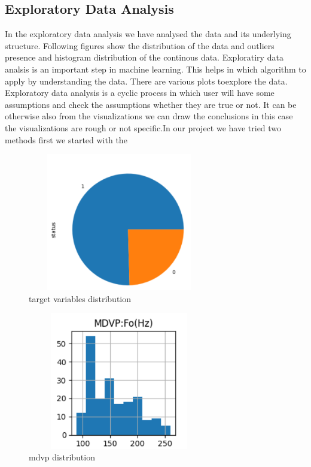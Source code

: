 \documentclass[conference]{IEEEtran}
\begin{document}
 \subsection{Exploratory Data Analysis}
In the exploratory data analysis we have analysed the data and its underlying structure. Following figures show the distribution of the data and outliers presence and histogram distribution of the continous data. Exploratiry data analsis is an important step in machine learning. This helps in which algorithm to apply by understanding the data. There are various plots toexplore the data. Exploratory data analysis is a cyclic process in which user will have some assumptions and check the assumptions whether they are true or not. It can be otherwise also from the visualizations we can draw the conclusions in this case the visualizations are rough or not specific.In our project we have tried two methods first we started with the 


 \begin{figure}[!ht]
     \centering
     \includegraphics[height=6cm,width=8cm]{distribution.png}
    \caption{target variables distribution}
    \label{fig:8}
 \end{figure}
 
 
 \begin{figure}[!ht]
     \centering
     \includegraphics[height=6cm,width=8cm]{mdvp.png}
    \caption{mdvp distribution}
    \label{fig:8}
 \end{figure}
\end{document}
